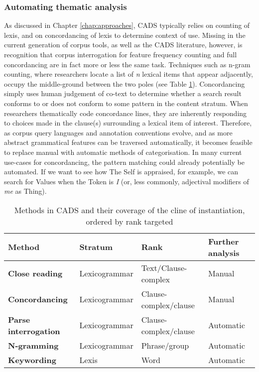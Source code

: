 \subsubsection{Automating thematic analysis}

As discussed in Chapter \ref{chap:approaches}, \gls{CADS} typically relies on counting of lexis, and on concordancing of lexis to determine context of use. Missing in the current generation of \gls{corpus} tools, as well as the \gls{CADS} literature, however, is recognition that \gls{corpus} interrogation for feature frequency counting and full concordancing are in fact more or less the same task. Techniques such as n\hyp{}gram counting, where researchers locate a list of \emph{n} lexical items that appear adjacently, occupy the middle\hyp{}ground between the two poles (see Table \ref{tab:CADSmethods}). Concordancing simply uses human judgement of co\hyp{}text to determine whether a search result conforms to or does not conform to some pattern in the content stratum. When researchers thematically code concordance lines, they are inherently responding to  choices made in the clause(s) surrounding a lexical item of interest. Therefore, as \gls{corpus} query languages and annotation conventions evolve, and as more abstract grammatical features can be traversed automatically, it becomes feasible to replace manual with automatic methods of categorisation. In many current use\hyp{}cases for concordancing, the pattern matching could already potentially be automated. If we want to see how The Self is appraised, for example, we can search for Values when the Token is \emph{I} (or, less commonly, adjectival modifiers of \emph{me} as Thing).

\begin{table}[htb]
    \begin{tabularx}{\textwidth}{llll}
    \toprule 
    \textbf{Method}   & \textbf{Stratum} & \textbf{Rank} & \textbf{Further analysis}  \\
    \midrule
    \textbf{Close reading}  & Lexicogrammar & Text\slash Clause-complex     & Manual      \\ 
    \textbf{Concordancing}  & Lexicogrammar & Clause-complex\slash clause   & Manual         \\  
    \textbf{Parse interrogation}  & Lexicogrammar & Clause-complex\slash clause   & Automatic    \\
    \textbf{N-gramming}  & Lexicogrammar & Phrase\slash group  & Automatic    \\
    \textbf{Keywording}  & Lexis         & Word                          & Automatic \\   
    \bottomrule
    \end{tabularx}
    \caption[Methods in CADS and the cline of instantiation]{Methods in CADS and their coverage of the cline of instantiation, ordered by rank targeted}
    \label{tab:CADSmethods}
\end{table}

